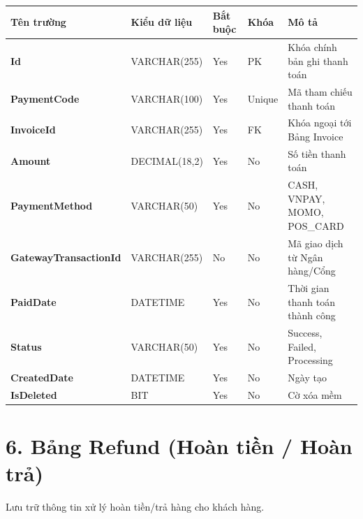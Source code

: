 \documentclass[11pt,a4paper]{article}
\begin{document}
	\begin{tabularx}{\textwidth}{|>{\bfseries}p{3.5cm}|p{2.5cm}|p{1.5cm}|p{1.8cm}|X|}
		\hline
		\rowcolor{tablehead} Tên trường & Kiểu dữ liệu & Bắt buộc & Khóa & Mô tả \\ \hline
		Id & VARCHAR(255) & Yes & PK & Khóa chính bản ghi thanh toán \\ \hline
		PaymentCode & VARCHAR(100) & Yes & Unique & Mã tham chiếu thanh toán \\ \hline
		InvoiceId & VARCHAR(255) & Yes & FK & Khóa ngoại tới Bảng Invoice \\ \hline
		Amount & DECIMAL(18,2) & Yes & No & Số tiền thanh toán \\ \hline
		PaymentMethod & VARCHAR(50) & Yes & No & CASH, VNPAY, MOMO, POS\_CARD \\ \hline
		GatewayTransactionId & VARCHAR(255) & No & No & Mã giao dịch từ Ngân hàng/Cổng \\ \hline
		PaidDate & DATETIME & Yes & No & Thời gian thanh toán thành công \\ \hline
		Status & VARCHAR(50) & Yes & No & Success, Failed, Processing \\ \hline
		CreatedDate & DATETIME & Yes & No & Ngày tạo \\ \hline
		IsDeleted & BIT & Yes & No & Cờ xóa mềm \\ \hline
	\end{tabularx}
	
	\vspace{1.5em}
	
	\section{6. Bảng Refund (Hoàn tiền / Hoàn trả)}
	Lưu trữ thông tin xử lý hoàn tiền/trả hàng cho khách hàng.
	
\end{document}
